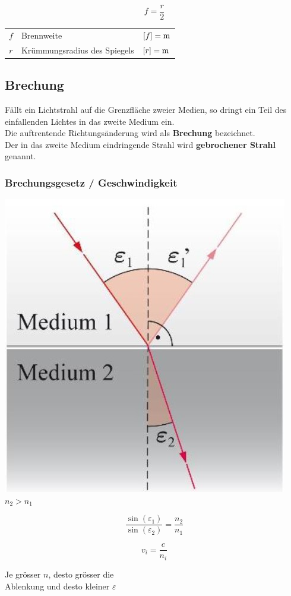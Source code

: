 $$ \boxed{ f = \frac{r}{2} } $$

\begin{tabular}{lll}
$f$ & Brennweite &  $[f] = \mathrm{m}$ \\
$r$ & Krümmungsradius des Spiegels & $[r] = \mathrm{m}$ \\
\end{tabular}





\subsection{Brechung}

Fällt ein Lichtstrahl auf die Grenzfläche zweier Medien, so dringt ein Teil des einfallenden Lichtes in das zweite Medium ein. \\
Die auftrentende Richtungsänderung wird als \textbf{Brechung} bezeichnet. \\
Der in das zweite Medium eindringende Strahl wird \textbf{gebrochener Strahl} genannt.




\subsubsection{Brechungsgesetz / Geschwindigkeit}

\begin{minipage}{0.48\linewidth}
\includegraphics[width=0.7\linewidth]{Bilder/Wellen-Optik/brechung} \\
$n_2 > n_1$  \\
\end{minipage}
\hfill
\begin{minipage}{0.48\linewidth}
$$ \boxed{ \frac{\sin(\varepsilon_1)}{\sin(\varepsilon_2)} = \frac{n_2}{n_1}  } $$

$$ \boxed{ v_i = \frac{c}{n_i}  } $$

Je grösser $n$, desto grösser die \\
Ablenkung und desto kleiner $\varepsilon$ \\

\end{minipage}


